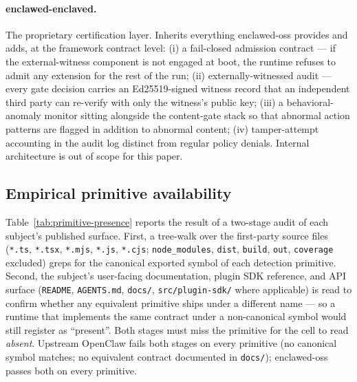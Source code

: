 \documentclass[11pt]{article}
\begin{document}
\paragraph{enclawed-enclaved.} The proprietary certification layer.
Inherits everything enclawed-oss provides and adds, at the framework
contract level: (i) a fail-closed admission contract --- if the
external-witness component is not engaged at boot, the runtime refuses
to admit any extension for the rest of the run; (ii) externally-witnessed
audit --- every gate decision carries an Ed25519-signed witness record
that an independent third party can re-verify with only the witness's
public key; (iii) a behavioral-anomaly monitor sitting alongside the
content-gate stack so that abnormal action patterns are flagged in
addition to abnormal content; (iv) tamper-attempt accounting in the
audit log distinct from regular policy denials. Internal architecture
is out of scope for this paper.

\subsection{Empirical primitive availability}

Table~\ref{tab:primitive-presence} reports the result of a two-stage
audit of each subject's published surface. First, a tree-walk over
the first-party source files (\texttt{*.ts}, \texttt{*.tsx},
\texttt{*.mjs}, \texttt{*.js}, \texttt{*.cjs}; \texttt{node\_modules},
\texttt{dist}, \texttt{build}, \texttt{out}, \texttt{coverage}
excluded) greps for the canonical exported symbol of each detection
primitive. Second, the subject's user-facing documentation, plugin
SDK reference, and API surface (\texttt{README}, \texttt{AGENTS.md},
\texttt{docs/}, \texttt{src/plugin-sdk/} where applicable) is read to
confirm whether any equivalent primitive ships under a different
name --- so a runtime that implements the same contract under a
non-canonical symbol would still register as ``present''. Both
stages must miss the primitive for the cell to read \emph{absent}.
Upstream OpenClaw fails both stages on every primitive (no canonical
symbol matches; no equivalent contract documented in
\texttt{docs/}); enclawed-oss passes both on every primitive.
\end{document}
